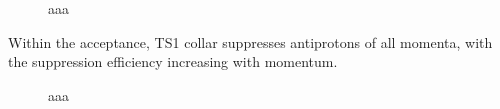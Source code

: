 \begin{figure}
  \caption{
    \label{figure:760_1022_vs_760_4022_ts4_tgtstops_simp_721_time}
    aaa
  }
\end{figure}

Within the acceptance, TS1 collar suppresses antiprotons of all momenta, with the suppression efficiency
increasing with momentum.

\begin{figure}
  \caption{
    \label{figure:760_1022_vs_760_4022_ts4_tgtstops_simp_721_mom}
    aaa
  }
\end{figure}




